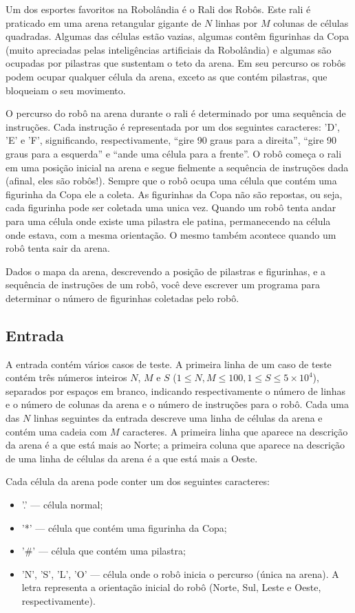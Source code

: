 Um dos esportes favoritos na Robolândia é o Rali dos Robôs. Este rali é
praticado em uma arena retangular gigante de $N$ linhas por $M$ colunas de células
quadradas. Algumas das células estão vazias, algumas contêm figurinhas da Copa
(muito apreciadas pelas inteligências artificiais da Robolândia) e algumas são
ocupadas por pilastras que sustentam o teto da arena. Em seu percurso os robôs
podem ocupar qualquer célula da arena, exceto as que contém pilastras, que
bloqueiam o seu movimento.

O percurso do robô na arena durante o rali é
determinado por uma sequência de instruções. Cada instrução é representada por
um dos seguintes caracteres: 'D', 'E' e 'F', significando, respectivamente,
``gire 90 graus para a direita'', ``gire 90 graus para a esquerda'' e ``ande uma
célula para a frente''. O robô começa o rali em uma posição inicial na arena e
segue fielmente a sequência de instruções dada (afinal, eles são robôs!).
Sempre que o robô ocupa uma célula que contém uma figurinha da Copa ele a
coleta. As figurinhas da Copa não são repostas, ou seja, cada figurinha pode
ser coletada uma unica vez. Quando um robô tenta andar para uma célula onde
existe uma pilastra ele patina, permanecendo na célula onde estava, com a
mesma orientação. O mesmo também acontece quando um robô tenta sair da
arena.

Dados o mapa da arena, descrevendo a posição de pilastras e figurinhas, e a
sequência de instruções de um robô, você deve escrever um programa para
determinar o número de figurinhas coletadas pelo robô.

\subsection*{Entrada}

A entrada contém vários casos de teste. A primeira linha de um caso de teste
contém três números inteiros $N$, $M$ e $S$
($1 \leq N, M \leq 100, 1 \leq S \leq 5 \times 10^4$),
separados por espaços em branco, indicando respectivamente o número de
linhas e o número de colunas da arena e o número de instruções para o robô.
Cada uma das $N$ linhas seguintes da entrada descreve uma linha de células da
arena e contém uma cadeia com $M$ caracteres. A primeira linha que aparece na
descrição da arena é a que está mais ao Norte; a primeira coluna que aparece
na descrição de uma linha de células da arena é a que está mais a Oeste.

Cada célula da arena pode conter um dos seguintes caracteres:
\begin{itemize}
\item '.' — célula normal;
\item '*' — célula que contém uma figurinha da Copa;
\item '\#' — célula que contém uma pilastra;
\item 'N', 'S', 'L', 'O' — célula onde o robô inicia o percurso (única na
      arena). A letra representa a orientação inicial do robô (Norte, Sul,
      Leste e Oeste, respectivamente).
\end{itemize}


